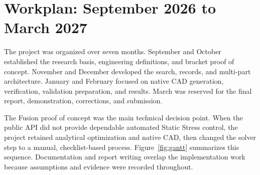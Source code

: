 \section{Workplan: September 2026 to March 2027}
\label{sec:workplan}

The project was organized over seven months. September and October established
the research basis, engineering definitions, and bracket proof of concept.
November and December developed the search, records, and multi-part
architecture. January and February focused on native CAD generation,
verification, validation preparation, and results. March was reserved for the
final report, demonstration, corrections, and submission.

The Fusion proof of concept was the main technical decision point. When the
public API did not provide dependable automated Static Stress control, the
project retained analytical optimization and native CAD, then changed the
solver step to a manual, checklist-based process. Figure~\ref{fig:gantt}
summarizes this sequence. Documentation and report writing overlap the
implementation work because assumptions and evidence were recorded throughout.

